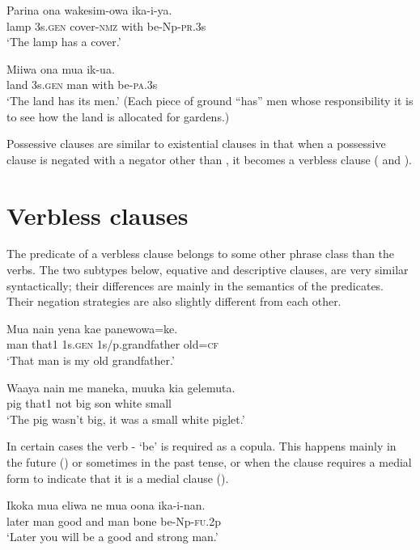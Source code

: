 \ea%
\label{ex:x1807}
\gll Parina  ona  wakesim-owa    ika-i-ya. \\
     lamp  3s.\textsc{gen}  cover-\textsc{nmz}  with  be-Np-\textsc{pr}.3s \\
\glt `The lamp has a cover.'
\z

\ea%
\label{ex:x1810}
\gll Miiwa  ona  mua    ik-ua. \\
     land  3s.\textsc{gen}  man  with  be-\textsc{pa}.3s \\
\glt `The land has its men.' (Each piece of ground ``has'' men whose responsibility it is to see how the land is allocated for gardens.)
\z

Possessive clauses are similar to existential clauses in that when a possessive clause is negated with a negator other than , it becomes a verbless clause ( and ).

\section{Verbless clauses}
\hypertarget{RefHeading22161935131865}{}
The predicate of a verbless clause belongs to some other phrase class than the verbs. The two subtypes below, equative and descriptive clauses, are very similar syntactically; their differences are mainly in the semantics of the predicates. Their negation strategies are also slightly different from each other. 

\ea%
\label{ex:x1036}
\gll Mua  nain  yena  kae  panewowa=ke. \\
     man  that1  1s.\textsc{gen}  1s/p.grandfather  old=\textsc{cf} \\
\glt `That man is my old grandfather.'
\z

\ea%
\label{ex:x1037}
\gll Waaya  nain  me  maneka,  muuka  kia  gelemuta. \\
     pig  that1  not  big  son  white  small \\
\glt `The pig wasn't big, it was a small white piglet.'
\z

In certain cases the verb - `be' is required as a copula. This happens mainly in the future () or sometimes in the past tense, or when the clause requires a medial form to indicate that it is a medial clause (). 

\ea%
\label{ex:x986}
\gll Ikoka  mua  eliwa  ne  mua  oona  ika-i-nan. \\
     later  man  good  and  man  bone  be-Np-\textsc{fu}.2p \\
\glt `Later you will be a good and strong man.'
\z

